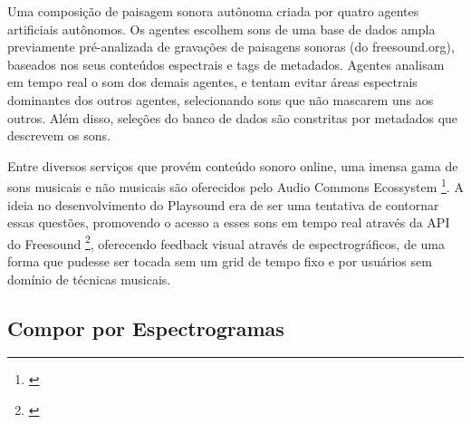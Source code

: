 \begin{citacao}
Uma composição de paisagem sonora autônoma criada por quatro agentes artificiais autônomos. Os agentes escolhem sons de uma base de dados ampla previamente pré-analizada de gravações de paisagens sonoras (do freesound.org), baseados nos seus conteúdos espectrais e tags de metadados. Agentes analisam em tempo real o som dos demais agentes, e tentam evitar áreas espectrais dominantes dos outros agentes, selecionando sons que não mascarem uns aos outros. Além disso, seleções do banco de dados são constritas por metadados que descrevem os sons. \cite{Arneeigenfeldt2010}

\end{citacao}

Entre diversos serviços que provém conteúdo sonoro online, uma imensa gama de sons musicais e não musicais são oferecidos pelo Audio Commons Ecossystem \footnote{\cite{Font2015}}. A ideia no desenvolvimento do Playsound era de ser uma tentativa de contornar essas questões, promovendo o acesso a esses sons em tempo real através da API do Freesound \footnote{\cite{Akkermans2011}}, oferecendo feedback visual através de espectrográficos, de uma forma que pudesse ser tocada sem um grid de tempo fixo e por usuários sem domínio de técnicas musicais.


\subsection{Compor por Espectrogramas}

